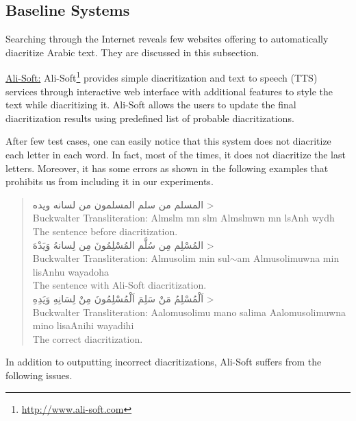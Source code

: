 \documentclass[conference]{IEEEtran}
\newcommand{\softpara}[1]{\smallskip \noindent \underline{#1}}
\begin{document}
\subsection{Baseline Systems}
\label{sec:tools}

Searching through the Internet reveals few websites offering to automatically diacritize Arabic text. They are discussed in this subsection.

\softpara{Ali-Soft:}
Ali-Soft\footnote{\url{http://www.ali-soft.com}} provides simple diacritization and text to speech (TTS) services through interactive web interface with additional features to style the text while diacritizing it.
Ali-Soft allows the users to update the final diacritization results using predefined list of probable diacritizations.

After few test cases, one can easily notice that this system does not diacritize each letter in each word. In fact, most of the times, it does not diacritize the last letters. Moreover, it has some errors as shown in the following examples that prohibits us from including it in our experiments.
\begin{quote}
\centering
\<
المسلم من سلم المسلمون من لسانه ويده
> \\
Buckwalter Transliteration: Almslm mn slm Almslmwn mn lsAnh wydh \\
The sentence before diacritization. \\
\<
المُسْلِم مِن سُلَّم المُسْلِمُونَ مِن لِسانهُ وَيَدْهَ
> \\
Buckwalter Transliteration: Almusolim min sul$\sim$am Almusolimuwna min lisAnhu wayadoha \\
The sentence with Ali-Soft diacritization. \\
\<
اَلْمُسْلِمُ مَنْ سَلِمَ اَلْمُسْلِمُونَ مِنْ لِسَانِهِ وَيَدِهِ
> \\
Buckwalter Transliteration: Aalomusolimu mano salima Aalomusolimuwna mino lisaAnihi wayadihi \\
The correct diacritization. \\
\end{quote}
In addition to outputting incorrect diacritizations, Ali-Soft suffers from the following issues.
\end{document}
